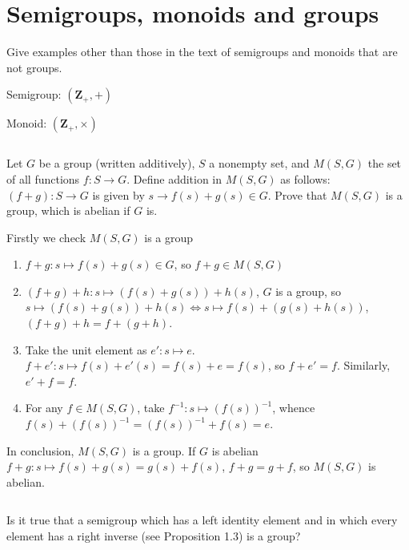 \section{Semigroups, monoids and groups}
\begin{ex}
    Give examples other than those in the text of semigroups and monoids that are not groups.
\end{ex}

\begin{answer}
    Semigroup: $(\mathbf{Z}_+, +)$

    Monoid: $(\mathbf{Z}_+, \times )$ 
\end{answer}

$$ $$

\begin{ex}
    Let $G$ be a group (written additively), $S$ a nonempty set, and $M(S,G)$ the set of all functions $f: S \rightarrow G$. Define addition in $M(S,G)$ as follows: $(f + g) : S \rightarrow G$ is given by $s \rightarrow f(s) + g(s) \in G$. Prove that $M(S,G)$ is a group, which is abelian if $G$ is.
\end{ex}

\begin{answer}
    Firstly we check $M(S,G)$ is a group
    \begin{enumerate}
        \item $f+g: s\mapsto f(s) + g(s) \in G$, so $f+g\in M(S,G)$
        \item $(f+g)+h: s\mapsto (f(s) + g(s)) + h(s)$, $G$ is a group, so $s\mapsto (f(s) + g(s)) + h(s)\Leftrightarrow s\mapsto f(s) + (g(s) + h(s))$, $(f+g)+h = f+(g+h)$.
        \item Take the unit element as $e': s\mapsto e$. $f+e': s\mapsto f(s)+ e'(s) =f(s)+e=f(s)$, so $f+e'=f$. Similarly, $e'+f = f$.
        \item For any $f\in M(S,G)$, take $f^{-1}: s\mapsto (f(s))^{-1}$, whence $f(s)+(f(s))^{-1}=(f(s))^{-1}+f(s)=e$.
    \end{enumerate}
    In conclusion, $M(S,G)$ is a group. If $G$ is abelian $f+g: s\mapsto f(s)+g(s)=g(s)+f(s)$, $f+g=g+f$, so $M(S,G)$ is abelian.
\end{answer}

$$ $$

\begin{ex}
    Is it true that a semigroup which has a left identity element and in which every element has a right inverse (see Proposition 1.3) is a group?
\end{ex}

